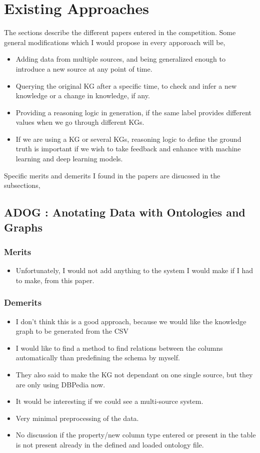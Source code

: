 \documentclass[runningheads]{llncs}
\begin{document}
\section{Existing Approaches}
The sections describe the different papers entered in the competition. Some general modifications which I would 
propose in every apporoach will be,
\begin{itemize}
    \item Adding data from multiple sources, and being generalized enough to introduce a new source at any point of time.
    \item Querying the original KG after a specific time, to check and infer a new knowledge or a change in knowledge, if any.
    \item Providing a reasoning logic in generation, if the same label provides different values when we go through different KGs.
    \item If we are using a KG or several KGs, reasoning logic to define the ground truth is important if we wish to take feedback and enhance with machine learning and deep learning models.
\end{itemize}
Specific merits and demerits I found in the papers are disucssed in the subsections,
\subsection{ADOG : Anotating Data with Ontologies and Graphs}
\subsubsection{Merits}
\begin{itemize}
    \item Unfortunately, I would not add anything to the system I would make if I had to make, from this paper.
\end{itemize}
\subsubsection{Demerits}
\begin{itemize} 
    \item I don't think this is a good approach, because we would like the knowledge graph to be generated from the CSV
    \item I would like to find a method to find relations between the columns automatically than predefining the schema by myself.
    \item They also said to make the KG not dependant on one single source, but they are only using DBPedia now.
    \item It would be interesting if we could see a multi-source system.
    \item Very minimal preprocessing of the data.
    \item No discussion if the property/new column type entered or present in the table is not present already in the defined and loaded ontology file.
\end{itemize}
\end{document}
